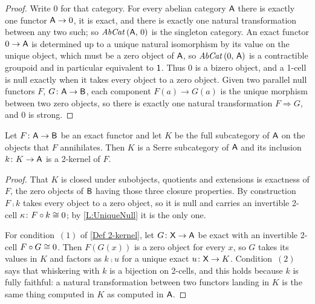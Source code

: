 \begin{proof}
  
  \leanok
  Write \(0\) for that category. For every abelian category \(\mathsf{A}\) there is exactly one functor \(\mathsf{A}\to 0\), it is exact, and there is exactly one natural transformation between any two such; so \({\mathit{AbCat}}\left({\mathsf{A}},\,{0}\right)\) is the singleton category. An exact functor \(0\to\mathsf{A}\) is determined up to a unique natural isomorphism by its value on the unique object, which must be a zero object of \(\mathsf{A}\), so \({\mathit{AbCat}}\left({0},\,{\mathsf{A}}\right)\) is a contractible groupoid and in particular equivalent to \(\mathsf{1}\). Thus \(0\) is a bizero object, and a 1-cell is null exactly when it takes every object to a zero object. Given two parallel null functors \(F\), \(G\colon\mathsf{A}\to\mathsf{B}\), each component \(F(a)\to G(a)\) is the unique morphism between two zero objects, so there is exactly one natural transformation \(F\Rightarrow G\), and \(0\) is strong.
\end{proof}

\begin{proposition}
  \label{P:AbCatKernel}   \leanok
  Let \(F\colon\mathsf{A}\to\mathsf{B}\) be an exact functor and let \(K\) be the full subcategory of \(\mathsf{A}\) on the objects that \(F\) annihilates. Then \(K\) is a Serre subcategory of \(\mathsf{A}\) and its inclusion \(k\colon K\to\mathsf{A}\) is a 2-kernel of \(F\).
\end{proposition}

\begin{proof}
  \leanok
  That \(K\) is closed under subobjects, quotients and extensions is exactness of \(F\), the zero objects of \(\mathsf{B}\) having those three closure properties. By construction \(F\comp k\) takes every object to a zero object, so it is null and carries an invertible 2-cell \(\kappa\colon F\circ k\cong 0\); by \lemx\ref{L:UniqueNull} it is the only one.

	For condition~\((1)\) of \ref{Def 2-kernel}, let \(G\colon\mathsf{X}\to\mathsf{A}\) be exact with an invertible 2-cell \(F\circ G\cong 0\). Then \(F(G(x))\) is a zero object for every \(x\), so \(G\) takes its values in \(K\) and factors as \(k\comp u\) for a unique exact \(u\colon\mathsf{X}\to K\). Condition~\((2)\) says that whiskering with \(k\) is a bijection on 2-cells, and this holds because \(k\) is fully faithful: a natural transformation between two functors landing in \(K\) is the same thing computed in \(K\) as computed in \(\mathsf{A}\).
\end{proof}

